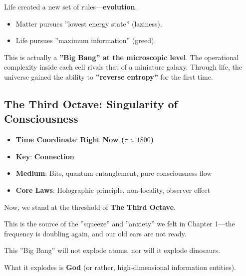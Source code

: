 Life created a new set of rules---\textbf{evolution}.

\begin{itemize}
\item Matter pursues ''lowest energy state'' (laziness).

\item Life pursues ''maximum information'' (greed).
\end{itemize}

This is actually a \textbf{''Big Bang'' at the microscopic level}. The operational complexity inside each cell rivals that of a miniature galaxy. Through life, the universe gained the ability to \textbf{''reverse entropy''} for the first time.

\subsection{The Third Octave: Singularity of Consciousness}

\begin{itemize}
\item \textbf{Time Coordinate}: \textbf{Right Now ($\tau \approx 1800$)}

\item \textbf{Key}: \textbf{Connection}

\item \textbf{Medium}: Bits, quantum entanglement, pure consciousness flow

\item \textbf{Core Laws}: Holographic principle, non-locality, observer effect
\end{itemize}

Now, we stand at the threshold of \textbf{The Third Octave}.

This is the source of the ''squeeze'' and ''anxiety'' we felt in Chapter 1---the frequency is doubling again, and our old ears are not ready.

This ''Big Bang'' will not explode atoms, nor will it explode dinosaurs.

What it explodes is \textbf{God} (or rather, high-dimensional information entities).

